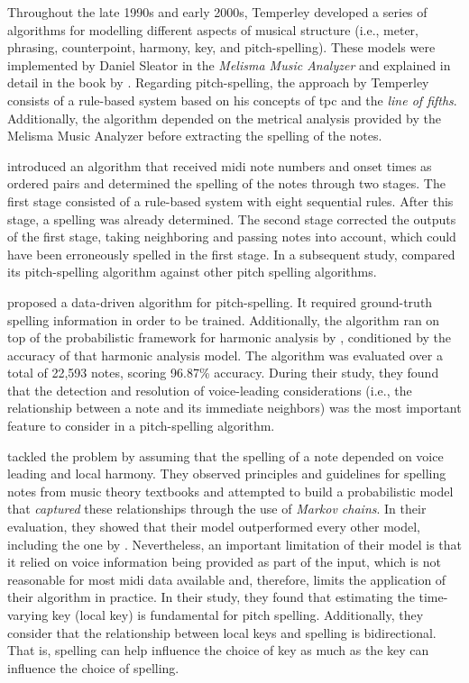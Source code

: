 Throughout the late 1990s and early 2000s, Temperley
developed a series of algorithms for modelling different
aspects of musical structure (i.e., meter, phrasing,
counterpoint, harmony, key, and pitch-spelling). These
models were implemented by Daniel Sleator in the
\emph{Melisma Music Analyzer} and explained in detail in the
book by \textcite{temperley2004cognition}. Regarding
pitch-spelling, the approach by Temperley consists of a
rule-based system based on his concepts of \gls{tpc} and the
\emph{line of fifths}. Additionally, the algorithm depended
on the metrical analysis provided by the Melisma Music
Analyzer before extracting the spelling of the notes.

\textcite{meredith2003pitch} introduced an algorithm that
received \gls{midi} note numbers and onset times as ordered
pairs and determined the spelling of the notes through two
stages. The first stage consisted of a rule-based system
with eight sequential rules. After this stage, a spelling
was already determined. The second stage corrected the
outputs of the first stage, taking neighboring and passing
notes into account, which could have been erroneously
spelled in the first stage. In a subsequent study,
\textcite{meredith2005comparing} compared its pitch-spelling
algorithm against other pitch spelling algorithms.

\textcite{stoddard2004welltempered} proposed a data-driven
algorithm for pitch-spelling. It required ground-truth
spelling information in order to be trained. Additionally,
the algorithm ran on top of the probabilistic framework for
harmonic analysis by \textcite{raphael2003harmonic},
conditioned by the accuracy of that harmonic analysis model.
The algorithm was evaluated over a total of 22,593 notes,
scoring 96.87\% accuracy. During their study, they found
that the detection and resolution of voice-leading
considerations (i.e., the relationship between a note and
its immediate neighbors) was the most important feature to
consider in a pitch-spelling algorithm.

\textcite{teodoru2007pitch} tackled the problem by assuming
that the spelling of a note depended on voice leading and
local harmony. They observed principles and guidelines for
spelling notes from music theory textbooks
\parencite{aldwell1978harmony,rimskykorsakov2005practical}
and attempted to build a probabilistic model that
\emph{captured} these relationships through the use of
\emph{Markov chains}. In their evaluation, they showed that
their model outperformed every other model, including the
one by \textcite{meredith2006ps13}. Nevertheless, an
important limitation of their model is that it relied on
voice information being provided as part of the input, which
is not reasonable for most \gls{midi} data available and,
therefore, limits the application of their algorithm in
practice. In their study, they found that estimating the
time-varying key (local key) is fundamental for pitch
spelling. Additionally, they consider that the relationship
between local keys and spelling is bidirectional. That is,
spelling can help influence the choice of key as much as the
key can influence the choice of spelling.
